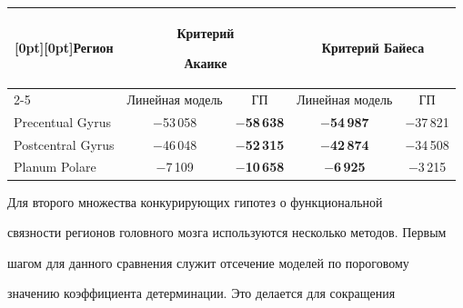 \begin{table}[b]\small %

\vspace*{-6pt}

       \begin{center}


      \vspace*{2ex}

      

      \begin{tabular}{|l|c|c|c|c|}

      \hline

\multicolumn{1}{|c|}{\raisebox{-6pt}[0pt][0pt]{Регион}}&\multicolumn{2}{c|}{Критерий 

Акаике}&\multicolumn{2}{c|}{Критерий Байеса}\\

      \cline{2-5}

 &Линейная модель&ГП&Линейная модель&ГП\\

      \hline

Precentual Gyrus&$-$53\,058&$-$\textbf{58\,638}&$-$\textbf{54\,987}&$-$37\,821\\

Postcentral Gyrus&$-$46\,048&$-$\textbf{52\,315}&$-$\textbf{42\,874}&$-$34\,508\\

Planum Polare&\hphantom{9}$-$7\,109&$-$\textbf{10\,658}&\hphantom{9}$-

$\textbf{6\,925}&\hphantom{9}$-$3\,215\\

      \hline

      \end{tabular}

      \end{center}

      \end{table} 

     

     Для второго множества конкурирующих гипотез о функциональной 

связности регионов головного мозга используются несколько методов. Первым 

шагом для данного сравнения служит отсечение моделей по пороговому 

значению коэффициента детерминации. Это делается для сокращения 

